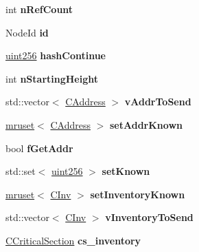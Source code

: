 \begin{DoxyCompactItemize}
\mbox{\label{class_c_node_a01f8cac776bef676651f9b8f3f80ae98}} 
int {\bfseries n\+Ref\+Count}
\item 
\mbox{\label{class_c_node_af99591c635f495fc1e6c14745a2a4203}} 
Node\+Id {\bfseries id}
\item 
\mbox{\label{class_c_node_a1a1c0d94de0197c5c4abf5a8d13364f3}} 
\mbox{\hyperlink{classuint256}{uint256}} {\bfseries hash\+Continue}
\item 
\mbox{\label{class_c_node_a597b41bd64e2ac9391b7211e65aeb52a}} 
int {\bfseries n\+Starting\+Height}
\item 
\mbox{\label{class_c_node_a9b2d9b9182ff111c79f704594c4aa2e1}} 
std\+::vector$<$ \mbox{\hyperlink{class_c_address}{C\+Address}} $>$ {\bfseries v\+Addr\+To\+Send}
\item 
\mbox{\label{class_c_node_ac21266ce880bd36b98ba7cfcc447a30f}} 
\mbox{\hyperlink{classmruset}{mruset}}$<$ \mbox{\hyperlink{class_c_address}{C\+Address}} $>$ {\bfseries set\+Addr\+Known}
\item 
\mbox{\label{class_c_node_a3da9c559959e182aff8439cd004ff624}} 
bool {\bfseries f\+Get\+Addr}
\item 
\mbox{\label{class_c_node_ab1b30fa8e48005752f6b0bcf43eca478}} 
std\+::set$<$ \mbox{\hyperlink{classuint256}{uint256}} $>$ {\bfseries set\+Known}
\item 
\mbox{\label{class_c_node_ae15aa9a971040800c26bc87b1250220f}} 
\mbox{\hyperlink{classmruset}{mruset}}$<$ \mbox{\hyperlink{class_c_inv}{C\+Inv}} $>$ {\bfseries set\+Inventory\+Known}
\item 
\mbox{\label{class_c_node_abcd24c9478bc1ab5ba6de6b369080cec}} 
std\+::vector$<$ \mbox{\hyperlink{class_c_inv}{C\+Inv}} $>$ {\bfseries v\+Inventory\+To\+Send}
\item 
\mbox{\label{class_c_node_a1e8b0784cc82f33edc2dc4e2834d1ff0}} 
\mbox{\hyperlink{class_annotated_mixin}{C\+Critical\+Section}} {\bfseries cs\+\_\+inventory}

\end{DoxyCompactItemize}
